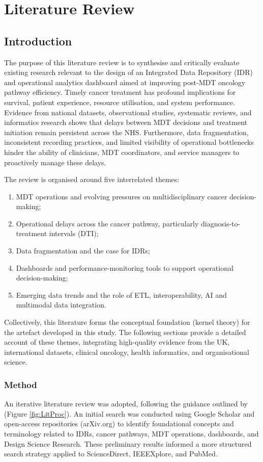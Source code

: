 \chapter{Literature Review}\label{lit}

\section{Introduction}

The purpose of this literature review is to synthesise and critically evaluate existing research relevant to the design of an Integrated Data Repository (IDR) and operational analytics dashboard aimed at improving post-MDT oncology pathway efficiency. Timely cancer treatment has profound implications for survival, patient experience, resource utilisation, and system performance. Evidence from national datasets, observational studies, systematic reviews, and informatics research shows that delays between MDT decisions and treatment initiation remain persistent across the NHS. Furthermore, data fragmentation, inconsistent recording practices, and limited visibility of operational bottlenecks hinder the ability of clinicians, MDT coordinators, and service managers to proactively manage these delays.

The review is organised around five interrelated themes:
\begin{enumerate}
    \item MDT operations and evolving pressures on multidisciplinary cancer decision-making;
    \item Operational delays across the cancer pathway, particularly diagnosis-to-treatment intervals (DTI);
    \item Data fragmentation and the case for IDRs;
    \item Dashboards and performance-monitoring tools to support operational decision-making;
    \item Emerging data trends and the role of ETL, interoperability, AI and multimodal data integration.
\end{enumerate}

Collectively, this literature forms the conceptual foundation (kernel theory) for the artefact developed in this study. The following sections provide a detailed account of these themes, integrating high-quality evidence from the UK, international datasets, clinical oncology, health informatics, and organisational science.

\subsection{Method}
An iterative literature review was adopted, following the guidance outlined by  \cite{dawson2015} (Figure \ref{fig:LitProc}). An initial search was conducted using Google Scholar and open-access repositories (arXiv.org) to identify foundational concepts and terminology related to IDRs, cancer pathways, MDT operations, dashboards, and Design Science Research. These preliminary results informed a more structured search strategy applied to ScienceDirect, IEEEXplore, and PubMed.


